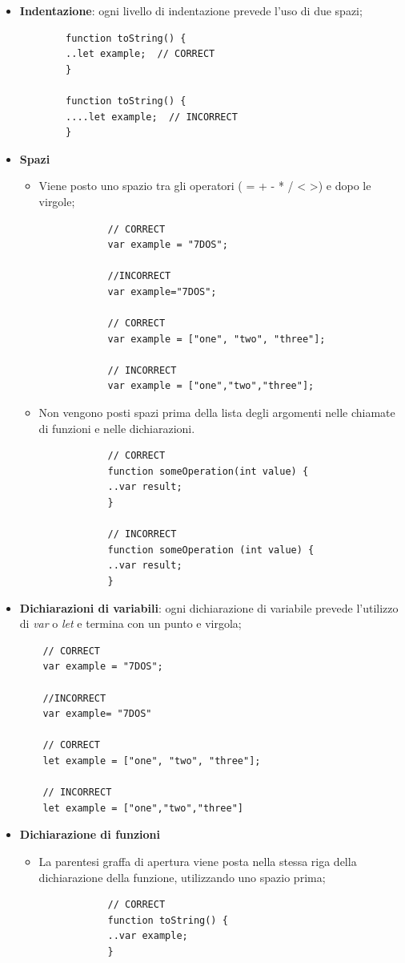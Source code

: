 \begin{itemize}
	\item{\textbf{Indentazione}}: ogni livello di indentazione prevede l'uso di due spazi;
	\begin{lstlisting}
		function toString() {
		..let example;  // CORRECT
		}
		
		function toString() {
		....let example;  // INCORRECT
		}
	\end{lstlisting}
	 
	\item{\textbf{Spazi}}
		\begin{itemize}
			\item{Viene posto uno spazio tra gli operatori ( = + - * / < >) e dopo le virgole;}
			\begin{lstlisting}
			// CORRECT
			var example = "7DOS";  
		
			//INCORRECT		
			var example="7DOS";  
			
			// CORRECT
			var example = ["one", "two", "three"];  
			
			// INCORRECT
			var example = ["one","two","three"];  
			\end{lstlisting} 
			\item{Non vengono posti spazi prima della lista degli argomenti nelle chiamate di funzioni e nelle dichiarazioni.}
			\begin{lstlisting}
			// CORRECT
			function someOperation(int value) {  
			..var result;
			}
			
			// INCORRECT
			function someOperation (int value) {  
			..var result;
			}
			\end{lstlisting}
		\end{itemize} 
	
	\item{\textbf{Dichiarazioni di variabili}: ogni dichiarazione di variabile prevede l'utilizzo di \emph{var} o \emph{let} e termina con un punto e virgola;}
	\begin{lstlisting}
	// CORRECT
	var example = "7DOS";  
	
	//INCORRECT
	var example= "7DOS"  
	
	// CORRECT
	let example = ["one", "two", "three"];  
	
	// INCORRECT
	let example = ["one","two","three"]  
	\end{lstlisting}
	
	\item{\textbf{Dichiarazione di funzioni}}
		\begin{itemize}
			\item{La parentesi graffa di apertura viene posta nella stessa riga della dichiarazione della funzione, utilizzando uno spazio prima;}
			\begin{lstlisting}
			// CORRECT
			function toString() {  
			..var example;
			}
			

\end{lstlisting}
\end{itemize}
\end{itemize}
